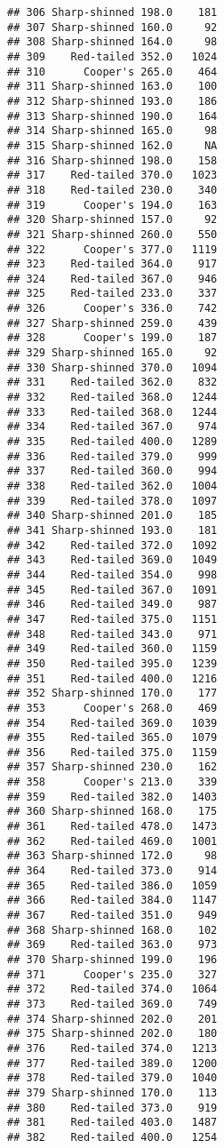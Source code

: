 \documentclass[
]{article}
\begin{document}
\begin{verbatim}
## 306 Sharp-shinned 198.0    181
## 307 Sharp-shinned 160.0     92
## 308 Sharp-shinned 164.0     98
## 309    Red-tailed 352.0   1024
## 310      Cooper's 265.0    464
## 311 Sharp-shinned 163.0    100
## 312 Sharp-shinned 193.0    186
## 313 Sharp-shinned 190.0    164
## 314 Sharp-shinned 165.0     98
## 315 Sharp-shinned 162.0     NA
## 316 Sharp-shinned 198.0    158
## 317    Red-tailed 370.0   1023
## 318    Red-tailed 230.0    340
## 319      Cooper's 194.0    163
## 320 Sharp-shinned 157.0     92
## 321 Sharp-shinned 260.0    550
## 322      Cooper's 377.0   1119
## 323    Red-tailed 364.0    917
## 324    Red-tailed 367.0    946
## 325    Red-tailed 233.0    337
## 326      Cooper's 336.0    742
## 327 Sharp-shinned 259.0    439
## 328      Cooper's 199.0    187
## 329 Sharp-shinned 165.0     92
## 330 Sharp-shinned 370.0   1094
## 331    Red-tailed 362.0    832
## 332    Red-tailed 368.0   1244
## 333    Red-tailed 368.0   1244
## 334    Red-tailed 367.0    974
## 335    Red-tailed 400.0   1289
## 336    Red-tailed 379.0    999
## 337    Red-tailed 360.0    994
## 338    Red-tailed 362.0   1004
## 339    Red-tailed 378.0   1097
## 340 Sharp-shinned 201.0    185
## 341 Sharp-shinned 193.0    181
## 342    Red-tailed 372.0   1092
## 343    Red-tailed 369.0   1049
## 344    Red-tailed 354.0    998
## 345    Red-tailed 367.0   1091
## 346    Red-tailed 349.0    987
## 347    Red-tailed 375.0   1151
## 348    Red-tailed 343.0    971
## 349    Red-tailed 360.0   1159
## 350    Red-tailed 395.0   1239
## 351    Red-tailed 400.0   1216
## 352 Sharp-shinned 170.0    177
## 353      Cooper's 268.0    469
## 354    Red-tailed 369.0   1039
## 355    Red-tailed 365.0   1079
## 356    Red-tailed 375.0   1159
## 357 Sharp-shinned 230.0    162
## 358      Cooper's 213.0    339
## 359    Red-tailed 382.0   1403
## 360 Sharp-shinned 168.0    175
## 361    Red-tailed 478.0   1473
## 362    Red-tailed 469.0   1001
## 363 Sharp-shinned 172.0     98
## 364    Red-tailed 373.0    914
## 365    Red-tailed 386.0   1059
## 366    Red-tailed 384.0   1147
## 367    Red-tailed 351.0    949
## 368 Sharp-shinned 168.0    102
## 369    Red-tailed 363.0    973
## 370 Sharp-shinned 199.0    196
## 371      Cooper's 235.0    327
## 372    Red-tailed 374.0   1064
## 373    Red-tailed 369.0    749
## 374 Sharp-shinned 202.0    201
## 375 Sharp-shinned 202.0    180
## 376    Red-tailed 374.0   1213
## 377    Red-tailed 389.0   1200
## 378    Red-tailed 379.0   1040
## 379 Sharp-shinned 170.0    113
## 380    Red-tailed 373.0    919
## 381    Red-tailed 403.0   1487
## 382    Red-tailed 400.0   1254

\end{verbatim}
\end{document}
